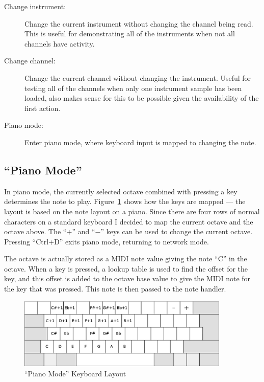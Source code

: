 \begin{description}
\item[Change instrument:] Change the current instrument without changing the channel being read.  
This is useful for demonstrating all of the instruments when not all channels have activity.
\item[Change channel:] Change the current channel without changing the instrument.  Useful for 
testing all of the channels when only one instrument sample has been loaded, also makes sense for 
this to be possible given the availability of the first action.
\item[Piano mode:] Enter piano mode, where keyboard input is mapped to changing the note.
\end{description}

\subsection{``Piano Mode''}

In piano mode, the currently selected octave combined with pressing a key determines the note to 
play.  Figure~\ref{fig:piano-mode} shows how the keys are mapped --- the layout is based on the note 
layout on a piano.  Since there are four rows of normal characters on a standard keyboard I decided 
to map the current octave and the octave above.  The ``$+$'' and ``$-$'' keys can be used to change 
the current octave.  Pressing ``Ctrl+D'' exits piano mode, returning to network mode.

The octave is actually stored as a MIDI note value giving the note ``C'' in the octave.  When a key 
is pressed, a lookup table is used to find the offset for the key, and this offset is added to the 
octave base value to give the MIDI note for the key that was pressed.  This note is then passed to 
the note handler.

\begin{figure}[htb]
\centering
\includegraphics[width=0.9\textwidth]{images/piano-mode}
\caption{``Piano Mode'' Keyboard Layout}\label{fig:piano-mode}
\end{figure}

